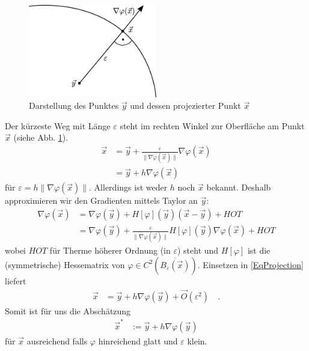       \begin{figure}
        \centering
        \includegraphics[width=0.5\textwidth]{bilder/projection/projection.eps}
        \caption[Projektion]{Darstellung des Punktes \( \vec{y} \) und dessen projezierter Punkt \( \vec{x} \)}
        \label{AbbProjection}
      \end{figure}
      Der kürzeste Weg mit Länge \( \varepsilon \) steht im rechten Winkel zur Oberfläche am Punkt \( \vec{x} \) (siehe Abb. \ref{AbbProjection}).
      \begin{align}
        \vec{x} &= \vec{y} + \frac{\varepsilon}{\|\nabla\varphi(\vec{x})\|} \nabla\varphi(\vec{x}) \\
                &= \vec{y} + h \nabla\varphi(\vec{x}) \label{EqProjection}
      \end{align}
      für \( \varepsilon = h \|\nabla\varphi(\vec{x})\| \).
      Allerdings ist weder \( h \) noch \( \vec{x} \) bekannt. 
      Deshalb approximieren wir den Gradienten mittels Taylor an \( \vec{y} \):
      \begin{align}
        \nabla\varphi(\vec{x}) &= \nabla\varphi(\vec{y}) + H[\varphi](\vec{y})(\vec{x}-\vec{y}) + HOT \\
                               &= \nabla\varphi(\vec{y}) + \frac{\varepsilon}{\|\nabla\varphi(\vec{x})\|} H[\varphi](\vec{y})\nabla\varphi(\vec{x}) + HOT
      \end{align}
      wobei  \( HOT \) für Therme höherer Ordnung (in \( \varepsilon \)) steht 
      und \( H[\varphi] \) ist die (symmetrische) Hessematrix von \( \varphi \in
      C^{2}\left(\overline{B_{\varepsilon}(\vec{x})}\right) \).
      Einsetzen in \eqref{EqProjection} liefert
      \begin{align}
        \vec{x} &= \vec{y} +  h \nabla\varphi(\vec{y}) + \vec{O}(\varepsilon^{2}) \quad\text{.}
      \end{align}
      Somit ist für uns die Abschätzung 
      \begin{align}
        \vec{x}^{*} &:= \vec{y} +  h \nabla\varphi(\vec{y})
      \end{align}
      für \( \vec{x} \) ausreichend falls \( \varphi \) hinreichend glatt und \( \varepsilon \) klein.

